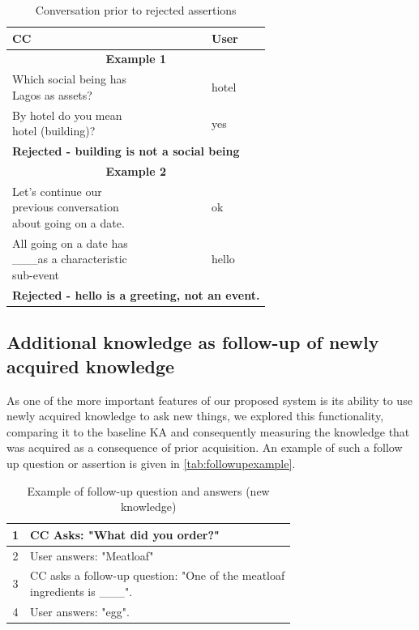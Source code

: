 {%
\begin{table}[h]
\centering
\caption{Conversation prior to rejected assertions}
\label{tab:rejectedconversation}
\begin{tabular}{|l|l|}
	\hline
	\textbf{CC}  & \textbf{User} \\
    \hline
    \multicolumn{2}{|c|}{\textbf{Example 1}} \\
    \hline
    \makecell[l]{Which social being has \\ Lagos as assets?} & hotel \\
    \hline
    \makecell[l]{By hotel do you mean\\ hotel (building)?} & yes\\
    \hline
    \multicolumn{2}{|l|}{\textbf{Rejected - building is not a social being}}\\
    \hline
    \multicolumn{2}{|c|}{\textbf{Example 2}} \\
    \hline
    \makecell[l]{Let's continue our\\ previous conversation \\ about going on a date.} & ok \\
    \hline
    \makecell[l]{All going on a date has\\ \_\_\_as a characteristic\\sub-event} & hello\\
    \hline
    \multicolumn{2}{|l|}{\textbf{Rejected - hello is a greeting, not an event.}}\\
    \hline
\end{tabular}
\end{table}

\subsection{Additional knowledge as follow-up of newly acquired knowledge}
\label{section:followups}
As one of the more important features of our proposed system is its ability to 
use newly acquired knowledge to ask new things, we explored this functionality, 
comparing it to the baseline KA and consequently measuring the knowledge that 
was acquired as a consequence of prior acquisition. An example of such a 
follow up question or assertion is given in \autoref{tab:followupexample}.

\begin{table}[h]
\centering
\caption{Example of follow-up question and answers (new knowledge)}
\label{tab:followupexample}
\begin{tabular}{|c|l|}
	\hline
	1  & CC Asks: "What did you order?" \\
    \hline
    2 & User answers: "Meatloaf" \\
    \hline
    3 & \makecell[l]{CC asks a follow-up question: "One of the meatloaf\\ ingredients is \_\_\_". }\\
    \hline
    4 & User answers: "egg". \\
    \hline
\end{tabular}
\end{table}

}
